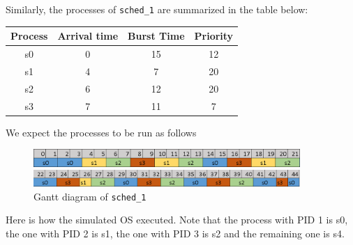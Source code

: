 \documentclass[a4paper]{article}
\numberwithin{equation}{section}
\begin{document}
Similarly, the processes of \texttt{sched_1} are summarized in the table below:
\begin{table}[H]
  \centering
  \begin{tabular}{cccc}
    \toprule
    Process & Arrival time & Burst Time & Priority \\
    \midrule
    s0      & 0            & 15         & 12       \\
    s1      & 4            & 7          & 20       \\
    s2      & 6            & 12         & 20       \\
    s3      & 7            & 11         & 7        \\
    \bottomrule
  \end{tabular}
\end{table}

We expect the processes to be run as follows
\begin{figure}[H]
  \centering
  \includegraphics[width=0.9\textwidth]{sched_1a.png}

  \medskip
  \includegraphics[width=0.9\textwidth]{sched_1b.png}
  \caption{Gantt diagram of \texttt{sched_1}}
\end{figure}

Here is how the simulated OS executed.
Note that the process with PID 1 is s0, the one with PID 2 is s1, the one with PID 3 is s2 and the remaining one is s4.
\end{document}
